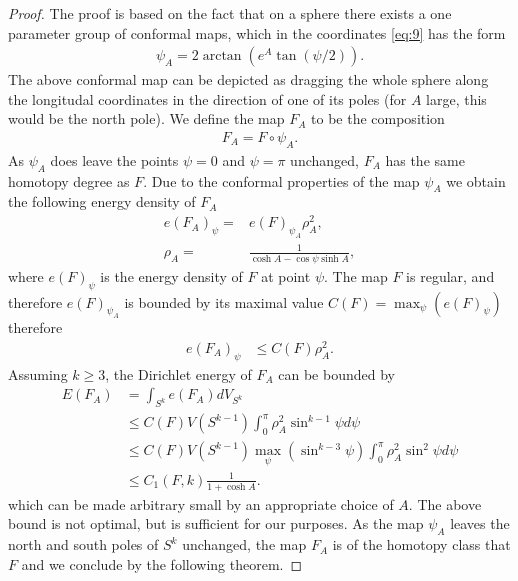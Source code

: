 \begin{proof}
  The proof is based on the fact that on a sphere there exists a one
  parameter group of conformal maps, which in the coordinates
  \eqref{eq:9} has the form
  \begin{align}
    \label{eq:12}
    \psi_A=2\arctan(e^A\tan(\psi/2)).
  \end{align}
  The above conformal map can be depicted as dragging the whole sphere
  along the longitudal coordinates in the direction of one of its
  poles (for $A$ large, this would be the north pole). We define the
  map $F_A$ to be the composition
  \begin{align}
    \label{eq:13}
    F_A=F\circ\psi_A.
  \end{align}
  As $\psi_A$ does leave the points $\psi=0$ and $\psi=\pi$ unchanged,
  $F_A$ has the same homotopy degree as $F$. Due to the conformal
  properties of the map $\psi_A$ we obtain the following energy
  density of $F_A$
  \begin{align}
    \label{eq:14}
    e(F_A)_\psi=&e(F)_{\psi_A}\rho_A^2,\\
    \rho_A=&\frac{1}{\cosh A-\cos\psi\sinh A},
  \end{align}
  where $e(F)_\psi$ is the energy density of $F$ at point $\psi$.  The
  map $F$ is regular, and therefore $e(F)_{\psi_A}$ is bounded by its
  maximal value $C(F)=\max_\psi\left(e(F)_\psi\right)$ therefore
  \begin{align}
    \label{eq:15}
    e(F_A)_\psi&\le C(F)\rho_A^2.
  \end{align}
  Assuming $k\ge3$, the Dirichlet energy of $F_A$ can be bounded by
  \begin{align}
    \label{eq:16}
    E(F_A)&=\int_{S^k}e(F_A)dV_{S^k}\\
    &\le C(F)V(S^{k-1})\int_{0}^{\pi}\rho_A^2\sin^{k-1}\psi d\psi\\
    &\le C(F)V(S^{k-1})\max_\psi(\sin^{k-3}\psi)\int_{0}^{\pi}\rho_A^2\sin^2\psi d\psi\\
    &\le C_1(F,k)\frac{1}{1+\cosh A}.
  \end{align}
  which can be made arbitrary small by an appropriate choice of
  $A$. The above bound is not optimal, but is sufficient for our
  purposes. As the map $\psi_A$ leaves the north and south poles of
  $S^k$ unchanged, the map $F_A$ is of the homotopy class that $F$ and
  we conclude by the following theorem.

\end{proof}



